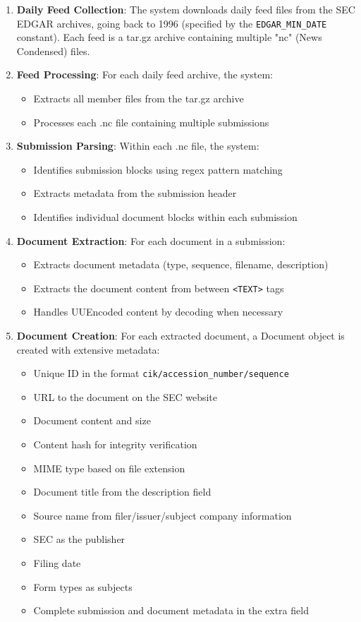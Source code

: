 \begin{enumerate}
  \item \textbf{Daily Feed Collection}: The system downloads daily feed files from the SEC EDGAR archives, going back to 1996 (specified by the \texttt{EDGAR\_MIN\_DATE} constant). Each feed is a tar.gz archive containing multiple "nc" (News Condensed) files.
  
  \item \textbf{Feed Processing}: For each daily feed archive, the system:
  \begin{itemize}
    \item Extracts all member files from the tar.gz archive
    \item Processes each .nc file containing multiple submissions
  \end{itemize}
  
  \item \textbf{Submission Parsing}: Within each .nc file, the system:
  \begin{itemize}
    \item Identifies submission blocks using regex pattern matching
    \item Extracts metadata from the submission header
    \item Identifies individual document blocks within each submission
  \end{itemize}
  
  \item \textbf{Document Extraction}: For each document in a submission:
  \begin{itemize}
    \item Extracts document metadata (type, sequence, filename, description)
    \item Extracts the document content from between \texttt{<TEXT>} tags
    \item Handles UUEncoded content by decoding when necessary
  \end{itemize}
  
  \item \textbf{Document Creation}: For each extracted document, a Document object is created with extensive metadata:
  \begin{itemize}
    \item Unique ID in the format \texttt{cik/accession\_number/sequence}
    \item URL to the document on the SEC website
    \item Document content and size
    \item Content hash for integrity verification
    \item MIME type based on file extension
    \item Document title from the description field
    \item Source name from filer/issuer/subject company information
    \item SEC as the publisher
    \item Filing date
    \item Form types as subjects
    \item Complete submission and document metadata in the extra field
  \end{itemize}
  

\end{enumerate}
